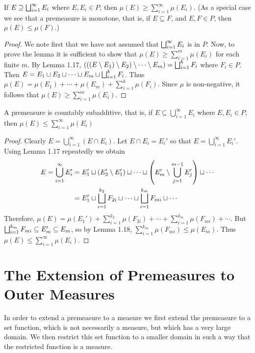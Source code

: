 \begin{lemma}
If $E \supseteq \bigsqcup_{i=1}^\infty E_i$ where $E, E_i \in P$, then $\mu(E) \geq \sum_{i=1}^\infty \mu(E_i)$. (As a special case we see that a premeasure is monotone, that is, if $E \subseteq F$, and $E, F \in P$, then $\mu(E) \leq \mu(F)$.)
\end{lemma}

\begin{proof}
We note first that we have not assumed that $\bigsqcup_{i=1}^\infty E_i$ is in $P$. Now, to prove the lemma it is sufficient to show that $\mu(E) \geq \sum_{i=1}^m\mu(E_i)$ for each finite $m$. By Lemma 1.17, $(((E\setminus E_1)\setminus E_2)\setminus\cdots\setminus E_m) =\bigsqcup_{i=1}^k F_i$ where $F_i \in P$. Then $E=E_1 \sqcup E_2 \sqcup \cdots \sqcup E_m\sqcup\bigsqcup_{i=1}^kF_i$. Thus $\mu(E)=\mu(E_1)+\cdots+\mu(E_m)+\sum_{i=1}^k\mu(F_i)$. Since $\mu$ is non-negative, it follows that $\mu(E) \geq \sum_{i=1}^m \mu(E_i)$.
\end{proof}

\begin{lemma}
A premeasure is countably subadditive, that is, if $E \subseteq \bigcup_{i=1}^\infty E_i$ where $E, E_i \in P$, then $\mu(E)\leq\sum_{i=1}^\infty\mu(E_i)$ 
\end{lemma}

\begin{proof}
Clearly $E=\bigcup_{i=1}^\infty(E \cap E_i)$. Let $E \cap E_i=E_i'$ so that $E=\bigcup_{i=1}^\infty E_i'$. Using Lemma 1.17 repeatedly we obtain 
\begin{align*}
    E=\bigcup_{i=1}^\infty E_i'&=E_1'\sqcup(E_2'\setminus E_1')\sqcup\cdots\sqcup\left(E_m'\setminus\bigcup_{j=1}^{m-1}E_j'\right)\sqcup\cdots\\
    &=E_1'\sqcup\bigsqcup_{i=1}^{k_2}F_{2i}\sqcup\cdots\sqcup\bigsqcup_{i=1}^{k_m} F_{mi}\sqcup\cdots\\
\end{align*}
Therefore, $\mu(E)=\mu(E_1')+\sum_{i=1}^{k_2}\mu(F_{2i})+\cdots+\sum_{i=1}^{k_m}\mu(F_{mi})+\cdots$. But $\bigsqcup_{i=1}^{k_m}F_{mi}\subseteq E_m'\subseteq E_m$, so by Lemma 1.18, $\sum_{i=1}^{k_m}\mu(F_{mi})\leq\mu(E_m)$. Thus $\mu(E)\leq\sum_{i=1}^\infty\mu(E_i)$.
\end{proof}

\section{The Extension of Premeasures to Outer Measures}

In order to extend a premeasure to a measure we first extend the premeasure to a set function, which is not necessarily a measure, but which has a very large domain. We then restrict this set function to a smaller domain in such a way that the restricted function is a measure.

